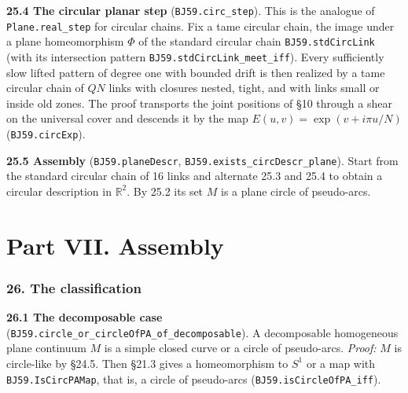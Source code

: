 \documentclass[11pt]{article}
\newcommand{\lean}[1]{\texttt{#1}}
\begin{document}
\textbf{25.4 The circular planar step} (\lean{BJ59.\hspace{0pt}circ\_\hspace{0pt}step}). This is the analogue of \lean{Plane.\hspace{0pt}real\_\hspace{0pt}step} for circular chains. Fix a tame circular chain, the image under a plane homeomorphism $\Phi$ of the standard circular chain \lean{BJ59.\hspace{0pt}stdCircLink} (with its intersection pattern \lean{BJ59.\hspace{0pt}stdCircLink\_\hspace{0pt}meet\_\hspace{0pt}iff}). Every sufficiently slow lifted pattern of degree one with bounded drift is then realized by a tame circular chain of $QN$ links with closures nested, tight, and with links small or inside old zones. The proof transports the joint positions of \S{}10 through a shear on the universal cover and descends it by the map $E(u, v) = \exp (v + i\pi u/N)$ (\lean{BJ59.\hspace{0pt}circExp}).

\textbf{25.5 Assembly} (\lean{BJ59.\hspace{0pt}planeDescr}, \lean{BJ59.\hspace{0pt}exists\_\hspace{0pt}circDescr\_\hspace{0pt}plane}). Start from the standard circular chain of 16 links and alternate 25.3 and 25.4 to obtain a circular description in $\mathbb{R}^2$. By 25.2 its set $M$ is a plane circle of pseudo-arcs.

\bigskip

\part*{Part VII. Assembly}

\section*{26. The classification}

\textbf{26.1 The decomposable case} (\lean{BJ59.\hspace{0pt}circle\_\hspace{0pt}or\_\hspace{0pt}circleOfPA\_\hspace{0pt}of\_\hspace{0pt}decomposable}). A decomposable homogeneous plane continuum $M$ is a simple closed curve or a circle of pseudo-arcs. \emph{Proof:} $M$ is circle-like by \S{}24.5. Then \S{}21.3 gives a homeomorphism to $S^1$ or a map with \lean{BJ59.\hspace{0pt}IsCircPAMap}, that is, a circle of pseudo-arcs (\lean{BJ59.\hspace{0pt}isCircleOfPA\_\hspace{0pt}iff}).
\end{document}
